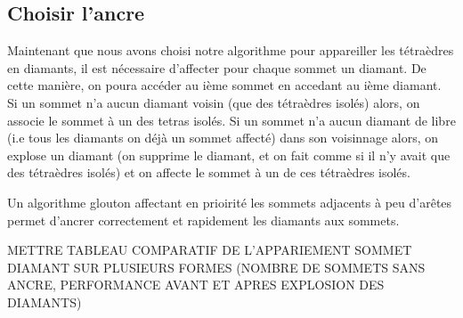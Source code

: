 \documentclass[a4paper,11pt,openany]{article}
\begin{document}
\subsection{Choisir l'ancre}
Maintenant que nous avons choisi notre algorithme pour appareiller les tétraèdres en diamants, il est nécessaire d'affecter pour chaque sommet un diamant. De cette manière, on poura accéder au ième sommet en accedant au ième diamant.\\
Si un sommet n'a aucun diamant voisin (que des tétraèdres isolés) alors, on associe le sommet à un des tetras isolés. Si un sommet n'a aucun diamant de libre (i.e tous les diamants on déjà un sommet affecté) dans son voisinnage alors, on explose un diamant (on supprime le diamant, et on fait comme si il n'y avait que des tétraèdres isolés) et on affecte le sommet à un de ces tétraèdres isolés.

\begin{figure}[H]
\begin{center}
\end{center}
\end{figure}
\noindent

\begin{figure}[H]
\begin{center}
\end{center}
\end{figure}
\noindent
Un algorithme glouton affectant en prioirité les sommets adjacents à peu d'arêtes permet d'ancrer correctement et rapidement les diamants aux sommets.

METTRE TABLEAU COMPARATIF DE L'APPARIEMENT SOMMET DIAMANT SUR PLUSIEURS FORMES
(NOMBRE DE SOMMETS SANS ANCRE, PERFORMANCE AVANT ET APRES EXPLOSION DES DIAMANTS)
\end{document}
